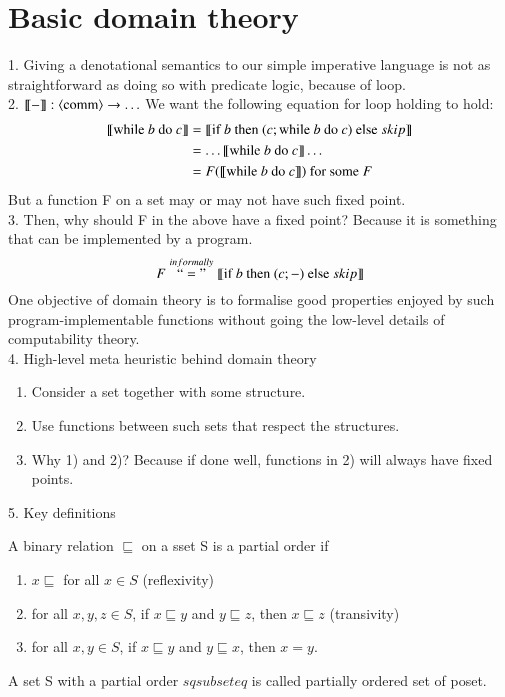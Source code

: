 \documentclass{report}[12pt]
\begin{document}
\section{Basic domain theory}
1. Giving a denotational semantics to our simple imperative language is not as straightforward as doing so with predicate logic, because of loop. \\
2. $\llbracket - \rrbracket:\langle \text{comm}\rangle \rightarrow \ldots$
We want the following equation for loop holding to hold:
\begin{align*}
    \llbracket \text{while }b \text{ do }c \rrbracket &= \llbracket \text{if }b\text{ then }(c;\text{while }b \text{ do }c)\text{ else }skip \rrbracket\\
    &=\ldots \llbracket \text{while }b \text{ do }c \rrbracket\ldots \\
    &=F(\llbracket \text{while }b \text{ do }c \rrbracket) \text{ for some }F
\end{align*}
But a function F on a set may or may not have such fixed point. \\
3. Then, why should F in the above have a fixed point? Because it is something that can be implemented by a program.
\[F\stackrel{informally}{``="}\llbracket \text{if }b\text{ then }(c;-)\text{ else }skip \rrbracket\]
One objective of domain theory is to formalise good properties enjoyed by such program-implementable functions without going the low-level details of computability theory. \\
4. High-level meta heuristic behind domain theory
\begin{enumerate}
    \item Consider a set together with some structure.
    \item Use functions between such sets that respect the structures.
    \item Why 1) and 2)? Because if done well, functions in 2) will always have fixed points.
\end{enumerate}
5. Key definitions
\begin{definition}
    A binary relation $\sqsubseteq$ on a sset S is a partial order if
    \begin{enumerate}
        \item $x\sqsubseteq$ for all $x \in S$ (reflexivity)
        \item for all $x, y, z\in S$, if $x\sqsubseteq y$ and $y \sqsubseteq z$, then $x \sqsubseteq z$ (transivity)
        \item for all $x, y \in S$, if $x \sqsubseteq y$ and $y \sqsubseteq x$, then $x=y$.
    \end{enumerate}
    A set S with a partial order $sqsubseteq$ is called partially ordered set of poset.
\end{definition}
\end{document}

